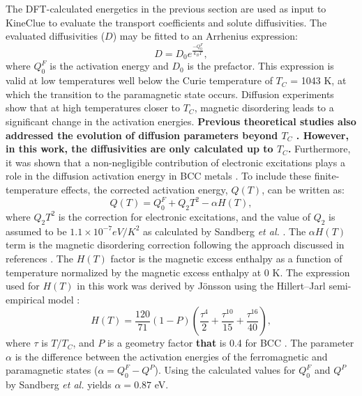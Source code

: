 \documentclass[preprint,12pt]{elsarticle}
\providecommand{\DIFaddtex}[1]{{\bf #1}} %
\providecommand{\DIFdeltex}[1]{} %
\providecommand{\DIFaddbegin}{\protect\color{blue}} %
\providecommand{\DIFaddend}{\protect\color{black}} %
\providecommand{\DIFdelbegin}{\protect\color{red}} %
\providecommand{\DIFdelend}{\protect\color{black}} %
\providecommand{\DIFadd}[1]{\texorpdfstring{\DIFaddtex{#1}}{#1}} %
\providecommand{\DIFdel}[1]{\texorpdfstring{\DIFdeltex{#1}}{}} %
\newcommand{\DIFscaledelfig}{0.5}
\newlength{\DIFdelgraphicswidth} %
\newlength{\DIFdelgraphicsheight} %
\newcommand{\DIFaddincludegraphics}[2][]{{\color{blue}\fbox{\DIFOincludegraphics[#1]{#2}}}} %
\newcommand{\DIFdelincludegraphics}[2][]{%
\sbox{\DIFdelgraphicsbox}{\DIFOincludegraphics[#1]{#2}}%
\settoboxwidth{\DIFdelgraphicswidth}{\DIFdelgraphicsbox} %
\settoboxtotalheight{\DIFdelgraphicsheight}{\DIFdelgraphicsbox} %
\scalebox{\DIFscaledelfig}{%
\parbox[b]{\DIFdelgraphicswidth}{\usebox{\DIFdelgraphicsbox}\\[-\baselineskip] \rule{\DIFdelgraphicswidth}{0em}}\llap{\resizebox{\DIFdelgraphicswidth}{\DIFdelgraphicsheight}{%
\setlength{\unitlength}{\DIFdelgraphicswidth}%
\begin{picture}(1,1)%
\thicklines\linethickness{2pt} %
{\color[rgb]{1,0,0}\put(0,0){\framebox(1,1){}}}%
{\color[rgb]{1,0,0}\put(0,0){\line( 1,1){1}}}%
{\color[rgb]{1,0,0}\put(0,1){\line(1,-1){1}}}%
\end{picture}%
}\hspace*{3pt}}} %
} %
\DeclareRobustCommand{\DIFaddbegin}{\DIFOaddbegin \let\includegraphics\DIFaddincludegraphics} %
\DeclareRobustCommand{\DIFaddend}{\DIFOaddend \let\includegraphics\DIFOincludegraphics} %
\DeclareRobustCommand{\DIFdelbegin}{\DIFOdelbegin \let\includegraphics\DIFdelincludegraphics} %
\DeclareRobustCommand{\DIFdelend}{\DIFOaddend \let\includegraphics\DIFOincludegraphics} %
\begin{document}
\noindent The DFT-calculated energetics in the previous section are used as input to KineClue \cite{schuler_kineclue_2020} to evaluate the transport coefficients and solute diffusivities. The evaluated diffusivities ($D$) may be fitted to an Arrhenius expression:
\begin{equation}
    D = D_0 e^{\frac{-Q_0^F}{k_B T}},
\end{equation}
where $Q_0^F$ is the activation energy and $D_0$ is the prefactor. This expression is valid at low temperatures well below the Curie temperature of $T_C$ = 1043 K, at which the transition to the paramagnetic state occurs. Diffusion experiments \cite{lubbehusen1990self, hettich1977self} show that at high temperatures closer to $T_C$, magnetic disordering leads to a significant change in the activation energies. \DIFaddbegin \DIFadd{Previous theoretical studies also addressed the evolution of diffusion parameters beyond $T_C$ \cite{PhysRevLett.124.215901, PhysRevB.107.094103}. However, in this work, the diffusivities are only calculated up to $T_C$.
}\DIFaddend Furthermore, it was shown that a non-negligible contribution of electronic excitations plays a role in the diffusion activation energy in BCC metals \cite{satta1998vacancy, sandberg2015modeling}. To include these finite-temperature effects, the corrected activation energy, $Q(T)$, can be written as:
\begin{equation}
\label{eq:corrected_Q}
    Q(T) = Q_0^F + Q_2T^2 -\alpha H(T),
\end{equation}
where $Q_2T^2$ is the correction for electronic excitations, and the value of $Q_2$ is assumed to be $1.1 \times 10^{-7} eV/K^2$ as calculated by Sandberg \textit{et al.} \cite{sandberg2015modeling}. The $\alpha H(T)$ term is the magnetic disordering correction following the approach discussed in references \cite{messina_systematic_2016, jonsson1992ferromagnetic}. The $H(T)$ factor is the magnetic excess enthalpy as a function of temperature normalized by the magnetic excess enthalpy at 0 K. The expression used for $H(T)$ in this work was derived by J\"{o}nsson \cite{jonsson1992ferromagnetic} using the Hillert--Jarl semi-empirical model \cite{hillert1978model}:
\begin{equation}
    H(T)=\frac{120}{71}(1-P)(\frac{\tau^{4}}{2}+\frac{\tau^{10}}{15}+\frac{\tau^{16}}{40}),
\end{equation}
where $\tau$ is $T/T_C$, and $P$ is a geometry factor \DIFdelbegin \DIFdel{and }\DIFdelend \DIFaddbegin \DIFadd{that }\DIFaddend is 0.4 for BCC \cite{jonsson1992ferromagnetic}. The parameter $\alpha$ is the difference between the activation energies of the ferromagnetic and paramagnetic states ($\alpha = Q^F_0-Q^P$). Using the calculated values for $Q^F_0$ and $Q^P$ by Sandberg \textit{et al.}\cite{sandberg2015modeling} yields $\alpha = 0.87$ eV.
\end{document}
